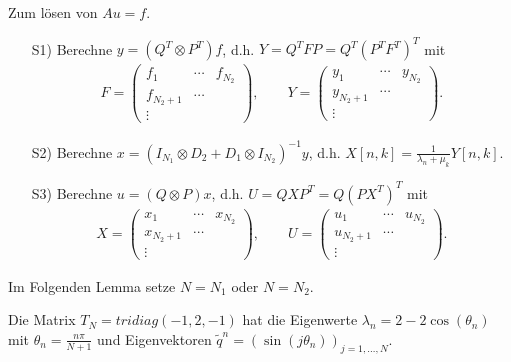 \begin{Algorithmus}
    Zum lösen von $Au = f$.
    \begin{itemize}
        \item[S1)]
	    Berechne $y = (Q^T \otimes P^T) f$, d.h.
        $Y = Q^T F P = Q^T (P^T F^T)^T$ mit
	    \begin{eqnarray*}
            F = \begin{pmatrix}
                  f_1 & \cdots & f_{N_2} \\
                  f_{N_2+1} & \cdots \\
                  \vdots
                \end{pmatrix}, \qquad
            Y = \begin{pmatrix}
                    y_1 & \cdots & y_{N_2} \\
                    y_{N_2+1} & \cdots \\
                    \vdots
                \end{pmatrix}.
	    \end{eqnarray*}
	\item[S2)]
	    Berechne $x = (I_{N_1} \otimes D_2 + D_1 \otimes I_{N_2})^{-1} y$, d.h.
	    $X[n, k] = \frac{1}{\lambda_n + \mu_k} Y[n, k]$.
	\item[S3)]
	    Berechne $u = (Q \otimes P) x$, d.h.
        $U = QXP^T = Q (P X^T)^T$ mit
	    \begin{eqnarray*}
            X = \begin{pmatrix}
                    x_1 & \cdots & x_{N_2} \\
                    x_{N_2+1} & \cdots \\
                    \vdots
                \end{pmatrix}, \qquad
            U = \begin{pmatrix}
                    u_1 & \cdots & u_{N_2} \\
                    u_{N_2+1} & \cdots \\
                    \vdots
                \end{pmatrix}.
	    \end{eqnarray*}
    \end{itemize}
\end{Algorithmus}
    

Im Folgenden Lemma setze $N = N_1$ oder $N = N_2$.


\begin{Lemma}
    \label{lem:2.11}
    Die Matrix $T_N = tridiag(-1, 2, -1)$ hat die Eigenwerte $\lambda_n = 2 - 2
    \cos(\theta_n)$ mit $\theta_n = \frac{n \pi}{N+1}$ und Eigenvektoren
    $\tilde q^n = (\sin(j \theta_n))_{j=1,\dots,N}$. 
\end{Lemma}


